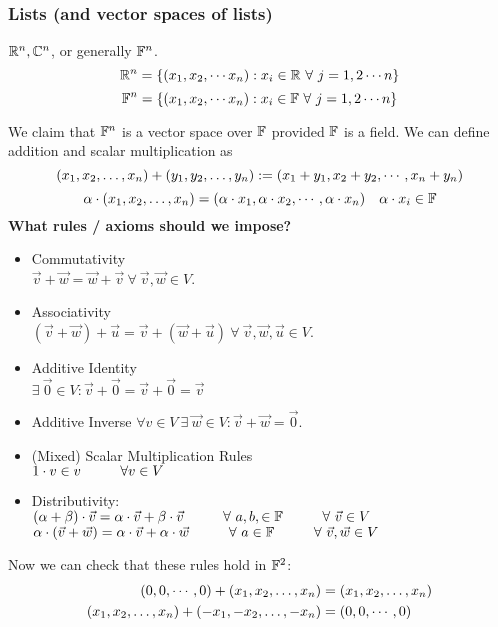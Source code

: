 \subsubsection{Lists (and vector spaces of lists)}
\begin{example} 
$\mathbb R^n, \mathbb C^n$, or generally $\mathbb F^n$. 
\[ \mathbb R^{n} = \left\{ (x_1,x_2, \cdots x_n) : x_i \in \mathbb R \ \forall \ j = 1,2 \cdots n \right\} \]
\[ \mathbb F^{n} = \left\{ (x_1,x_2, \cdots x_n) : x_i \in \mathbb F \ \forall \ j = 1,2 \cdots n \right\} \]
\end{example}
\noindent We claim that $\mathbb F^n$ is a vector space over $\mathbb F$ provided $\mathbb F$ is a field. We can define addition and scalar multiplication as 
\[ ({x}_1,{x}_2, \ldots, {x}_{n}) + ({y}_1,{y}_2, \ldots, {y}_{n}) := (x_1 + y_1, x_2 + y_2, \cdots , x_n + y_n)\]
\[ \alpha \cdot ({x}_1,{x}_2, \ldots, {x}_{n}) =  ( \alpha \cdot x_1, \alpha \cdot x_2, \cdots, \alpha \cdot x_n)\ \ \ \alpha \cdot x_i \in \mathbb F\]
\textbf{What rules / axioms should we impose?}
\begin{itemize}
    \item Commutativity \\
    $\vec v + \vec w = \vec w + \vec v \ \forall \ \vec v,\vec w \in V$. 
    \item Associativity \\
    $(\vec v + \vec w) + \vec u = \vec v + (\vec w + \vec u) \ \forall \ \vec v, \vec w, \vec u \in V$. 
    \item Additive Identity \\
    $\exists \ \vec 0 \in V : \vec v + \vec 0 = \vec v + \vec 0 = \vec v$ 
    \item Additive Inverse
    $\forall v \in V \ \exists \ \vec w \in V : \vec v + \vec w = \vec 0$.
    \item (Mixed) Scalar Multiplication Rules \\
    $1 \cdot v \in v \hspace{1cm} \forall v \in V$
    \item Distributivity:  \\
    $(\alpha + \beta ) \cdot \vec v = \alpha \cdot \vec v + \beta \cdot \vec v \tab \forall \ a,b, \in \b F \tab \forall \ \vec v \in V$ \\
    $\alpha \cdot (\vec v + \vec w) = \alpha \cdot \vec v + \alpha \cdot \vec w \tab \forall \ a \in \b F \tab \forall \ \vec v ,\vec w \in V$
\end{itemize}
Now we can check that these rules hold in $\mathbb F^2$:
\begin{align*}
    (0,0,\cdots,0) + ({x}_1,{x}_2, \ldots, {x}_{n}) &= ({x}_1,{x}_2, \ldots, {x}_{n}) \\
    ({x}_1,{x}_2, \ldots, {x}_{n}) + ({-x}_1,{-x}_2, \ldots, {-x}_{n}) &= (0,0,\cdots,0) 
\end{align*} \\
